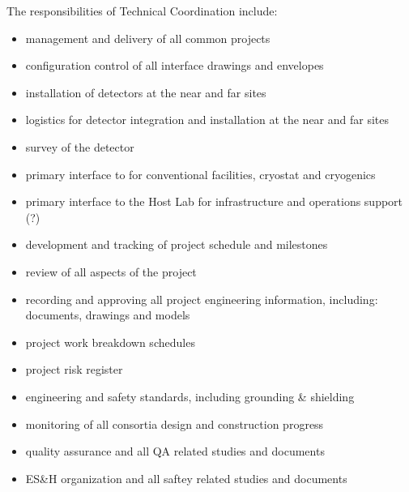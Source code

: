 The responsibilities of Technical Coordination include:
\begin{itemize}
  \item management and delivery of all common projects
  \item configuration control of all interface drawings and envelopes
  \item installation of detectors at the near and far sites
  \item logistics for detector integration and installation at the near and far sites
  \item survey of the detector
  \item primary interface to  for conventional facilities, cryostat and cryogenics
  \item primary interface to the Host Lab for infrastructure and operations support (?)
  \item development and tracking of project schedule and milestones
  \item review of all aspects of the project
  \item recording and approving all project engineering information, including: documents, drawings and models
  \item project work breakdown schedules
  \item project risk register
  \item {} engineering and safety standards, including grounding \& shielding
  \item monitoring of all consortia design and construction progress
  \item quality assurance and all QA related studies and documents
  \item ES\&H organization and all saftey related studies and documents
\end {itemize}

